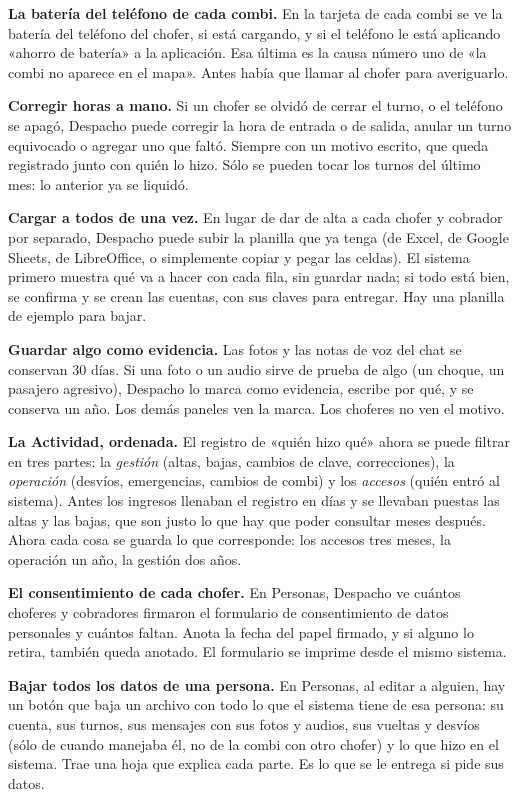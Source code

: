 \documentclass[12pt,a4paper]{article}
\begin{document}
\textbf{La batería del teléfono de cada combi.} En la tarjeta de cada combi
se ve la batería del teléfono del chofer, si está cargando, y si el teléfono
le está aplicando «ahorro de batería» a la aplicación. Esa última es la causa
número uno de «la combi no aparece en el mapa». Antes había que llamar al
chofer para averiguarlo.

\textbf{Corregir horas a mano.} Si un chofer se olvidó de cerrar el turno, o
el teléfono se apagó, Despacho puede corregir la hora de entrada o de salida,
anular un turno equivocado o agregar uno que faltó. Siempre con un motivo
escrito, que queda registrado junto con quién lo hizo. Sólo se pueden tocar
los turnos del último mes: lo anterior ya se liquidó.

\textbf{Cargar a todos de una vez.} En lugar de dar de alta a cada chofer y
cobrador por separado, Despacho puede subir la planilla que ya tenga (de
Excel, de Google Sheets, de LibreOffice, o simplemente copiar y pegar las
celdas). El sistema primero muestra qué va a hacer con cada fila, sin guardar
nada; si todo está bien, se confirma y se crean las cuentas, con sus claves
para entregar. Hay una planilla de ejemplo para bajar.

\textbf{Guardar algo como evidencia.} Las fotos y las notas de voz del chat
se conservan 30 días. Si una foto o un audio sirve de prueba de algo (un
choque, un pasajero agresivo), Despacho lo marca como evidencia, escribe por
qué, y se conserva un año. Los demás paneles ven la marca. Los choferes no
ven el motivo.

\textbf{La Actividad, ordenada.} El registro de «quién hizo qué» ahora se
puede filtrar en tres partes: la \emph{gestión} (altas, bajas, cambios de
clave, correcciones), la \emph{operación} (desvíos, emergencias, cambios de
combi) y los \emph{accesos} (quién entró al sistema). Antes los ingresos
llenaban el registro en días y se llevaban puestas las altas y las bajas, que
son justo lo que hay que poder consultar meses después. Ahora cada cosa se
guarda lo que corresponde: los accesos tres meses, la operación un año, la
gestión dos años.

\textbf{El consentimiento de cada chofer.} En Personas, Despacho ve cuántos
choferes y cobradores firmaron el formulario de consentimiento de datos
personales y cuántos faltan. Anota la fecha del papel firmado, y si alguno lo
retira, también queda anotado. El formulario se imprime desde el mismo
sistema.

\textbf{Bajar todos los datos de una persona.} En Personas, al editar a
alguien, hay un botón que baja un archivo con todo lo que el sistema tiene de
esa persona: su cuenta, sus turnos, sus mensajes con sus fotos y audios, sus
vueltas y desvíos (sólo de cuando manejaba él, no de la combi con otro
chofer) y lo que hizo en el sistema. Trae una hoja que explica cada parte. Es
lo que se le entrega si pide sus datos.
\end{document}
